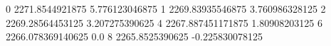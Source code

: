 0 2271.8544921875 5.776123046875
1 2269.83935546875 3.760986328125
2 2269.28564453125 3.207275390625
4 2267.887451171875 1.80908203125
6 2266.078369140625 0.0
8 2265.8525390625 -0.225830078125
